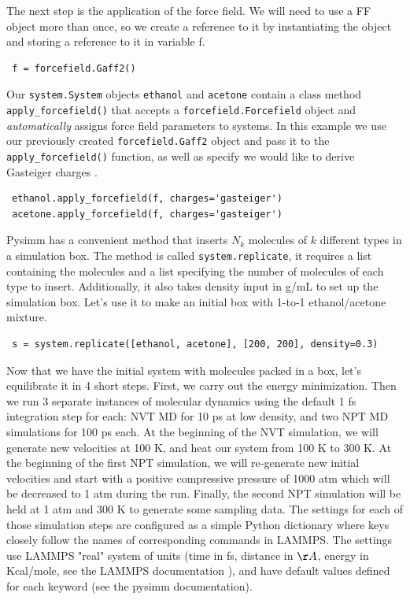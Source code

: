 \documentclass[9pt,tutorial]{livecoms}
\begin{document}
The next step is the application of the force field. We will need to use a FF object more than once, so we create a reference to it by instantiating the object and storing a reference to it in variable f.

\begin{lstlisting}
 f = forcefield.Gaff2()
\end{lstlisting}

Our \lstinline$system.System$ objects \lstinline$ethanol$ and \lstinline$acetone$ contain a class method \lstinline$apply_forcefield()$ that accepts a \lstinline$forcefield.Forcefield$ object and \textit{automatically} assigns force field parameters to systems. In this example we use our previously created \lstinline$forcefield.Gaff2$ object and pass it to the \lstinline$apply_forcefield()$ function, as well as specify we would like to derive Gasteiger charges \cite{gasteiger}.

\begin{lstlisting}
 ethanol.apply_forcefield(f, charges='gasteiger')
 acetone.apply_forcefield(f, charges='gasteiger')
\end{lstlisting}

Pysimm has a convenient method that inserts $N_k$ molecules of $k$ different types in a simulation box. The method is called \lstinline$system.replicate$, it requires a list containing the molecules and a list specifying the number of molecules of each type to insert. Additionally, it also takes density input in g/mL to set up the simulation box. Let's use it to make an initial box with 1-to-1 ethanol/acetone mixture.

\begin{lstlisting}
 s = system.replicate([ethanol, acetone], [200, 200], density=0.3)
\end{lstlisting}

Now that we have the initial system with molecules packed in a box, let's equilibrate it in 4 short steps. First, we carry out the energy minimization. Then we run 3 separate instances of molecular dynamics using the default 1 fs integration step for each: NVT MD for 10 ps at low density, and two NPT MD simulations for 100 ps each. At the beginning of the NVT simulation, we will generate new velocities at 100 K, and heat our system from 100 K to 300 K. At the beginning of the first NPT simulation, we will re-generate new initial velocities and start with a positive compressive pressure of 1000 atm which will be decreased to 1 atm during the run. Finally, the second NPT simulation will be held at 1 atm and 300 K to generate some sampling data. The settings for each of those simulation steps are configured as a simple Python dictionary where keys closely follow the names of corresponding commands in LAMMPS. The settings use LAMMPS "real" system of units (time in fs, distance in $\AA$, energy in Kcal/mole, see the LAMMPS documentation \cite{lmps:units}), and have default values defined for each keyword (see the pysimm documentation).
\end{document}
